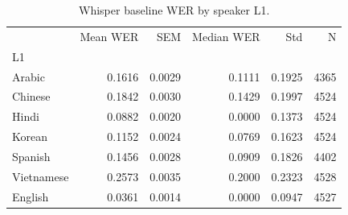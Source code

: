 \begin{table}
\caption{Whisper baseline WER by speaker L1.}
\label{tab:whisper_baseline_wer}
\begin{tabular}{lrrrrr}
\toprule
 & Mean WER & SEM & Median WER & Std & N \\
L1 &  &  &  &  &  \\
\midrule
Arabic & 0.1616 & 0.0029 & 0.1111 & 0.1925 & 4365 \\
Chinese & 0.1842 & 0.0030 & 0.1429 & 0.1997 & 4524 \\
Hindi & 0.0882 & 0.0020 & 0.0000 & 0.1373 & 4524 \\
Korean & 0.1152 & 0.0024 & 0.0769 & 0.1623 & 4524 \\
Spanish & 0.1456 & 0.0028 & 0.0909 & 0.1826 & 4402 \\
Vietnamese & 0.2573 & 0.0035 & 0.2000 & 0.2323 & 4528 \\
English & 0.0361 & 0.0014 & 0.0000 & 0.0947 & 4527 \\
\bottomrule
\end{tabular}
\end{table}
